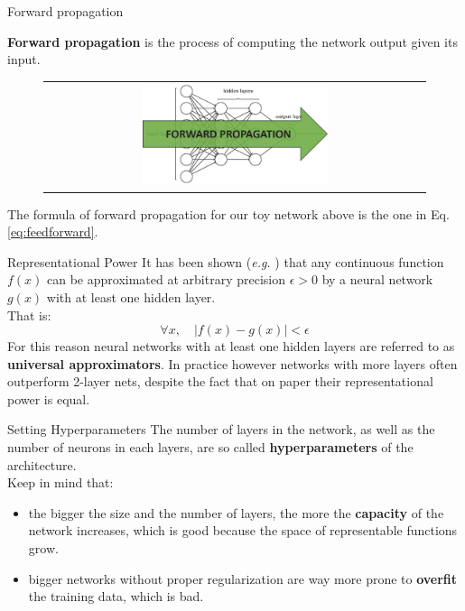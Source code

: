 \documentclass[aspectratio=169]{beamer}
\begin{document}
\begin{frame}{Forward propagation}

\textbf{Forward propagation} is the process of computing the network output given its input.
\begin{figure}
\begin{tabular}{c}
\includegraphics[width=0.5\textwidth]{img/dnn/forward_prop.jpg}
\end{tabular}
\end{figure}
The formula of forward propagation for our toy network above is the one in Eq. \ref{eq:feedforward}.

\end{frame}


\begin{frame}{Representational Power}
It has been shown (\emph{e.g.} \cite{cybenko1989approximation}) that any continuous function $f(x)$ can be approximated at arbitrary precision $\epsilon > 0$ by a neural network $g(x)$ with at least one hidden layer.\\
That is:
\begin{equation*}
\forall x, \quad |f(x) - g(x)| < \epsilon
\end{equation*}
For this reason neural networks with at least one hidden layers are referred to as \textbf{universal approximators}.
In practice however networks with more layers often outperform 2-layer nets, despite the fact that on paper their representational power is equal.
\end{frame}


\begin{frame}{Setting Hyperparameters}
The number of layers in the network, as well as the number of neurons in each layers, are so called \textbf{hyperparameters} of the architecture.\\
\vspace{0.25cm}
Keep in mind that:
\begin{itemize}
\item the bigger the size and the number of layers, the more the \textbf{capacity} of the network increases, which is good because the space of representable functions grow.\\
\item bigger networks without proper regularization are way more prone to \textbf{overfit} the training data, which is bad.
\end{itemize}

\end{frame}
\end{document}
